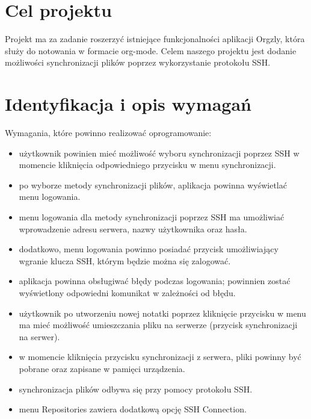 \documentclass[12pt]{article}
\begin{document}
\tableofcontents
\newpage

\section{Cel projektu}

Projekt ma za zadanie roszerzyć istniejące funkcjonalności aplikacji Orgzly, która służy do notowania w formacie org-mode. Celem naszego projektu jest dodanie możliwości synchronizacji plików poprzez wykorzystanie protokołu SSH. 

\section{Identyfikacja i opis wymagań}
Wymagania, które powinno realizować oprogramowanie:
\begin{itemize}
    \item użytkownik powinien mieć możliwość wyboru synchronizacji poprzez SSH w momencie kliknięcia odpowiedniego przycisku w menu synchronizacji.
    \item po wyborze metody synchronizacji plików, aplikacja powinna wyświetlać menu logowania.
    \item menu logowania dla metody synchronizacji poprzez SSH ma umożliwiać wprowadzenie adresu serwera, nazwy użytkownika oraz hasła.
    \item dodatkowo, menu logowania powinno posiadać przycisk umożliwiający wgranie klucza SSH, którym będzie można się zalogować.
    \item aplikacja powinna obsługiwać błędy podczas logowania; powinnien zostać wyświetlony odpowiedni komunikat w zależności od błędu.
    \item użytkownik po utworzeniu nowej notatki poprzez kliknięcie przycisku w menu ma mieć możliwość umieszczania pliku na serwerze (przycisk synchronizacji na serwer).
    \item w momencie kliknięcia przycisku synchronizacji z serwera, pliki powinny być pobrane oraz zapisane w pamięci urządzenia.
    \item synchronizacja plików odbywa się przy pomocy protokołu SSH.
    \item menu Repositories zawiera dodatkową opcję SSH Connection.
\end{itemize}
\end{document}
